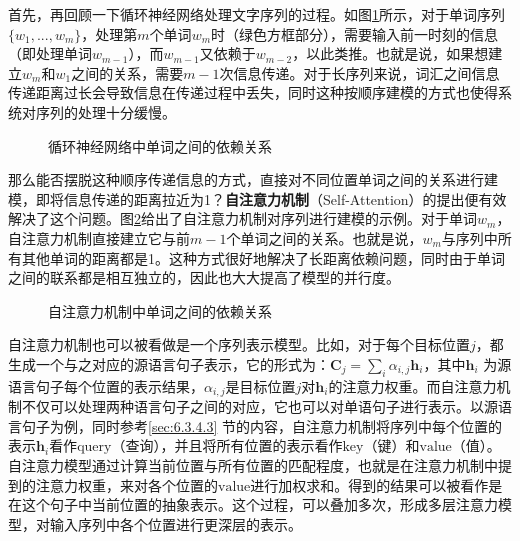 \parinterval 首先，再回顾一下循环神经网络处理文字序列的过程。如图\ref{fig:6-36}所示，对于单词序列$\{ w_1,...,w_m \}$，处理第$m$个单词$w_m$时（绿色方框部分），需要输入前一时刻的信息（即处理单词$w_{m-1}$），而$w_{m-1}$又依赖于$w_{m-2}$，以此类推。也就是说，如果想建立$w_m$和$w_1$之间的关系，需要$m-1$次信息传递。对于长序列来说，词汇之间信息传递距离过长会导致信息在传递过程中丢失，同时这种按顺序建模的方式也使得系统对序列的处理十分缓慢。

\begin{figure}[htp]
\centering

\caption{循环神经网络中单词之间的依赖关系}
\label{fig:6-36}
\end{figure}

\parinterval 那么能否摆脱这种顺序传递信息的方式，直接对不同位置单词之间的关系进行建模，即将信息传递的距离拉近为1？{\small\sffamily\bfseries{自注意力机制}}（Self-Attention）的提出便有效解决了这个问题\cite{DBLP:journals/corr/LinFSYXZB17}。图\ref{fig:6-37}给出了自注意力机制对序列进行建模的示例。对于单词$w_m$，自注意力机制直接建立它与前$m-1$个单词之间的关系。也就是说，$w_m$与序列中所有其他单词的距离都是1。这种方式很好地解决了长距离依赖问题，同时由于单词之间的联系都是相互独立的，因此也大大提高了模型的并行度。

\begin{figure}[htp]
\centering

\caption{自注意力机制中单词之间的依赖关系}
\label{fig:6-37}
\end{figure}

\parinterval 自注意力机制也可以被看做是一个序列表示模型。比如，对于每个目标位置$j$，都生成一个与之对应的源语言句子表示，它的形式为：$\mathbf{C}_j = \sum_i \alpha_{i,j}\mathbf{h}_i$，其中$\mathbf{h}_i$ 为源语言句子每个位置的表示结果，$\alpha_{i,j}$是目标位置$j$对$\mathbf{h}_i$的注意力权重。而自注意力机制不仅可以处理两种语言句子之间的对应，它也可以对单语句子进行表示。以源语言句子为例，同时参考\ref{sec:6.3.4.3} 节的内容，自注意力机制将序列中每个位置的表示$\mathbf{h}_i$看作$\mathrm{query}$（查询），并且将所有位置的表示看作$\mathrm{key}$（键）和$\mathrm{value}$（值）。自注意力模型通过计算当前位置与所有位置的匹配程度，也就是在注意力机制中提到的注意力权重，来对各个位置的$\mathrm{value}$进行加权求和。得到的结果可以被看作是在这个句子中当前位置的抽象表示。这个过程，可以叠加多次，形成多层注意力模型，对输入序列中各个位置进行更深层的表示。

